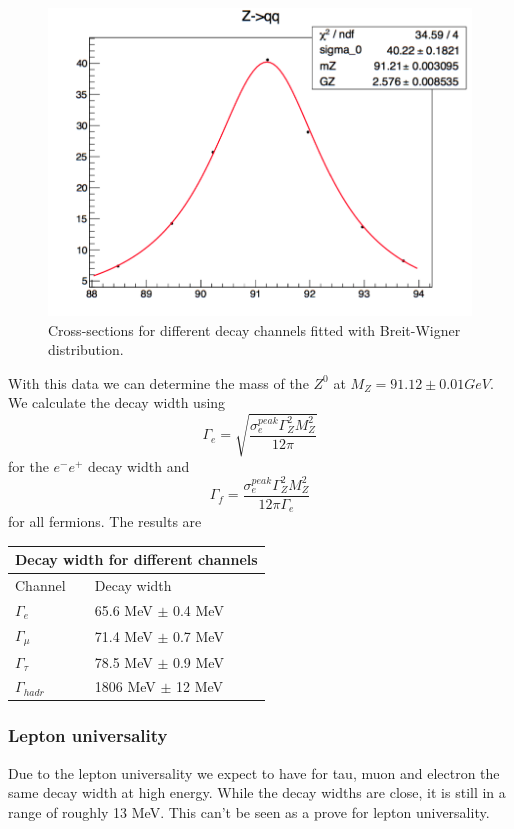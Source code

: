 \documentclass[]{article}
\begin{document}
\begin{figure}[H]
	\includegraphics[scale=0.25]{z-qq}
	\caption{Cross-sections for different decay channels fitted with Breit-Wigner distribution.}
	\label{fig:cross-bw}
\end{figure}
With this data we can determine the mass of the $Z^0$ at $M_Z=91.12 \pm 0.01 GeV$.
We calculate the decay width using
\begin{equation}
\Gamma_e = \sqrt{\frac{\sigma^{peak}_e \Gamma_Z^2 M_Z^2}{12 \pi}}
\end{equation}
for the $e^-e^+$ decay width and
\begin{equation}
\Gamma_f = \frac{\sigma^{peak}_e \Gamma_Z^2 M_Z^2}{12 \pi \Gamma_e}
\end{equation}
for all fermions.
The results are
\newline
\newline
\begin{tabular}{ |p{3cm}||p{5cm}|  }
 \hline
 \multicolumn{2}{|c|}{Decay width for different channels} \\
 \hline
 Channel & Decay width \\
 \hline
  $\Gamma_e $   & 65.6 MeV $\pm$ 0.4 MeV \\
  $\Gamma_{\mu} $   & 71.4 MeV $\pm$ 0.7 MeV  \\
  $\Gamma_{\tau} $   & 78.5 MeV $\pm$ 0.9 MeV  \\
  $\Gamma_{hadr} $   & 1806 MeV $\pm$ 12 MeV \\
  \hline
\end{tabular}
\newline
\newline
\subsubsection{Lepton universality}
Due to the lepton universality we expect to have for tau, muon and electron the same decay width at high energy. While the decay widths are close, it is still in a range of roughly 13 MeV. This can't be seen as a prove for lepton universality.
\end{document}
